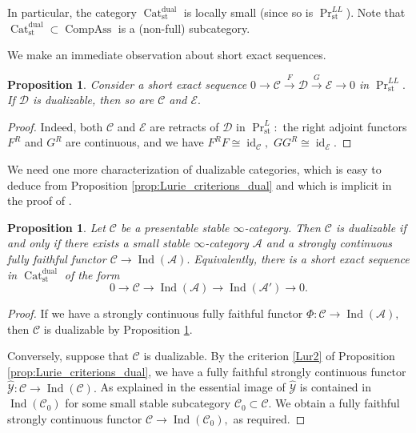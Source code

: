 \documentclass[11pt,leqno]{amsart}
\newtheorem{prop}[theo]{Proposition}
\numberwithin{equation}{section}
\newcommand{\xto}{\xrightarrow}
\newcommand{\Cat}{\operatorname{Cat}}
\newcommand{\st}{\operatorname{st}}
\newcommand{\dual}{\operatorname{dual}}
\newcommand{\cD}{{\mathcal D}}
\newcommand{\cA}{{\mathcal A}}
\newcommand{\cC}{{\mathcal C}}
\newcommand{\cE}{{\mathcal E}}
\newcommand{\cY}{{\mathcal Y}}
\newcommand{\Compass}{\operatorname{CompAss}}
\newcommand{\Ind}{\operatorname{Ind}}
\newcommand{\id}{\operatorname{id}}
\begin{document}
In particular, the category $\Cat_{\st}^{\dual}$ is locally small (since so is $\Pr^{LL}_{\st}$). Note that $\Cat_{\st}^{\dual}\subset \Compass$ is a (non-full) subcategory. 

We make an immediate observation about short exact sequences.

\begin{prop}\label{prop:ses_Pr^LL} Consider a short exact sequence $0\to\cC\xto{F}\cD\xto{G}\cE\to 0$ in $\Pr^{LL}_{\st}.$ If $\cD$ is dualizable, then so are $\cC$ and $\cE.$\end{prop}

\begin{proof}Indeed, both $\cC$ and $\cE$ are retracts of $\cD$ in $\Pr^L_{\st}:$ the right adjoint functors $F^R$ and $G^R$ are continuous, and we have $F^R F\cong\id_{\cC},$ $G G^R\cong\id_{\cE}.$\end{proof}

We need one more characterization of dualizable categories, which is easy to deduce from Proposition \ref{prop:Lurie_criterions_dual} and which is implicit in the proof of \cite[Proposition D.7.3.1]{Lur18}.

\begin{prop}\label{prop:dualizable_via_ses} Let $\cC$ be a presentable stable $\infty$-category. Then $\cC$ is dualizable if and only if there exists a small stable $\infty$-category $\cA$ and a strongly continuous fully faithful functor $\cC\to\Ind(\cA).$ Equivalently, there is a short exact sequence in $\Cat_{\st}^{\dual}$ of the form \begin{equation}\label{eq:presentation_as_kernel}0\to \cC\to\Ind(\cA)\to\Ind(\cA')\to 0.\end{equation}\end{prop}

\begin{proof}If we have a strongly continuous fully faithful functor $\Phi:\cC\to\Ind(\cA),$ then $\cC$ is dualizable by Proposition \ref{prop:ses_Pr^LL}.

Conversely, suppose that $\cC$ is dualizable. By the criterion \ref{Lur2} of Proposition \ref{prop:Lurie_criterions_dual}, we have a fully faithful strongly continuous functor $\hat{\cY}:\cC\to \Ind(\cC).$ As explained in \cite[Proof of Proposition D.7.3.1]{Lur18} the essential image of $\hat{\cY}$ is contained in $\Ind(\cC_0)$ for some small stable subcategory $\cC_0\subset\cC.$ We obtain a fully faithful strongly continuous functor $\cC\to\Ind(\cC_0),$ as required.\end{proof}
\end{document}
